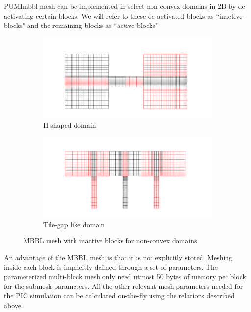 \documentclass[a4paper,12pt]{article}
\begin{document}
PUMImbbl mesh can be implemented in select non-convex domains in 2D by de-activating certain blocks. We will refer to these de-activated blocks as ``inactive-blocks" and the remaining blocks as ``active-blocks"

\begin{figure}[H]
	\centering
	\begin{subfigure}[b]{0.45\textwidth}
		\centering
		\includegraphics[scale=0.2,clip,trim=100 50 100 100]{figures/MBBL_nc_4x3.png}
		\caption{H-shaped domain}
	\end{subfigure}
	\hspace{0.25cm}
	\begin{subfigure}[b]{0.45\textwidth}
		\centering
		\includegraphics[scale=0.2,clip,trim=100 50 100 100]{figures/MBBL_nc_9x2.png}
		\caption{Tile-gap like domain}
	\end{subfigure}
	\caption{MBBL mesh with inactive blocks for non-convex domains}
	\label{fig:nonconvex_MBBL_2D_eg}
\end{figure} 

An advantage of the MBBL mesh is that it is not explicitly stored. Meshing inside each block is implicitly defined through a set of parameters. The parameterized multi-block mesh only need utmost 50 bytes of memory per block for the submesh parameters. All the other relevant mesh parameters needed for the PIC simulation can be calculated on-the-fly using the relations described above. 
\end{document}

